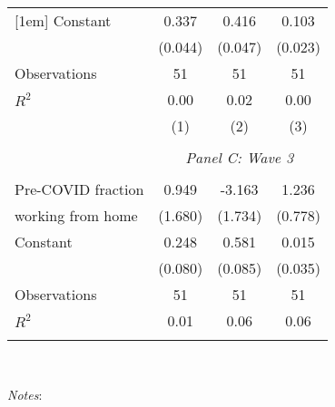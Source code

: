 \begin{table}[!htbp]
\begin{tabular}{@{\extracolsep{5pt}}lccc}
[1em]
Constant            &       0.337\sym{***}&       0.416\sym{***}&       0.103\sym{***}\\
                    &     (0.044)         &     (0.047)         &     (0.023)         \\
[1em]
Observations        &          51         &          51         &          51         \\
\(R^{2}\)           &        0.00         &        0.02         &        0.00         \\
                    &\multicolumn{1}{c}{(1)}         &\multicolumn{1}{c}{(2)}         &\multicolumn{1}{c}{(3)}         \\
\hline \\               & \multicolumn{3}{c}{\textit{Panel C: Wave 3}} \\               \addlinespace[1mm] \\
Pre-COVID fraction  &       0.949         &      -3.163\sym{*}  &       1.236         \\
working from home   &     (1.680)         &     (1.734)         &     (0.778)         \\
[1em]
Constant            &       0.248\sym{***}&       0.581\sym{***}&       0.015         \\
                    &     (0.080)         &     (0.085)         &     (0.035)         \\
[1em]
Observations        &          51         &          51         &          51         \\
\(R^{2}\)           &        0.01         &        0.06         &        0.06         \\
\hline                         \hline                          \hline \\[-1.8ex]                          \end{tabular}                         \\                         \begin{minipage}{1.0 \textwidth}                         {\footnotesize \emph{Notes}:                          \starlanguage}                         \end{minipage}                         \end{table}
